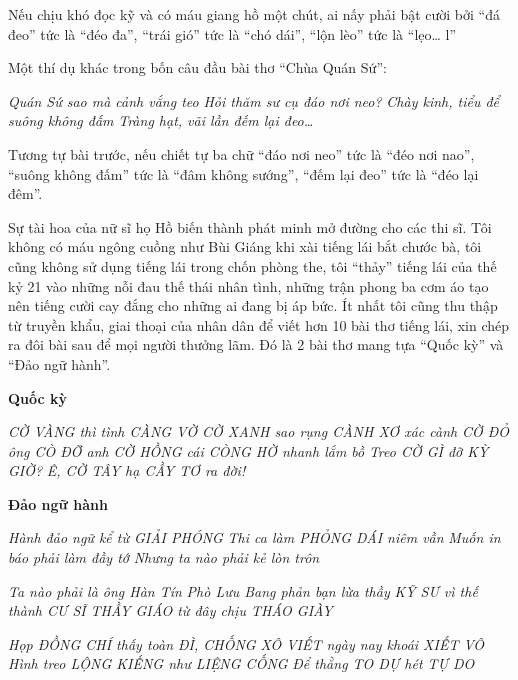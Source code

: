 \documentclass[../main.tex]{subfiles}
\begin{document}
\begin{multicols}{2}
\begin{blockquote}
\end{blockquote}
 
Nếu chịu khó đọc kỹ và có máu giang hồ một chút, ai nấy phải bật cười bởi “đá đeo” tức là “đéo đa”, “trái gió” tức là “chó dái”, “lộn lèo” tức là “lẹo… l” 
 
Một thí dụ khác trong bốn câu đầu bài thơ “Chùa Quán Sứ”: 
\begin{blockquote}
        
\textit{Quán Sứ sao mà cảnh vắng teo}        
\textit{Hỏi thăm sư cụ đáo nơi neo?}        
\textit{Chày kinh, tiểu để suông không đấm} 
\textit{Tràng hạt, vãi lần đếm lại đeo…} 

\end{blockquote}
 
Tương tự bài trước, nếu chiết tự ba chữ “đáo nơi neo” tức là “đéo nơi nao”, “suông không đấm” tức là “đâm không sướng”, “đếm lại đeo” tức là “đéo lại đêm”. 
 
Sự tài hoa của nữ sĩ họ Hồ biến thành phát minh mở đường cho các thi sĩ. Tôi không có máu ngông cuồng như Bùi Giáng khi xài tiếng lái bắt chước bà, tôi cũng không sử dụng tiếng lái trong chốn phòng the, tôi “thảy” tiếng lái của thế kỷ 21 vào những nỗi đau thế thái nhân tình, những trận phong ba cơm áo tạo nên tiếng cười cay đắng cho những ai đang bị áp bức. Ít nhất tôi cũng thu thập từ truyền khẩu, giai thoại của nhân dân để viết hơn 10 bài thơ tiếng lái, xin chép ra đôi bài sau để mọi người thưởng lãm. Ðó là 2 bài thơ mang tựa “Quốc kỳ” và “Ðảo ngữ hành”. 
\begin{blockquote}
 
\textbf{Quốc kỳ} 
        
\textit{CỜ VÀNG thì tình CÀNG VỜ}        
\textit{CỜ XANH  sao rụng CÀNH XƠ xác cành}        
\textit{CỜ ĐỎ ông CÒ ĐỠ anh}        
\textit{CỜ HỒNG cái CÒNG HỜ nhanh lắm bồ}        
\textit{Treo CỜ GÌ đỡ KỲ GIỜ?} 
\textit{Ê, CỜ TÂY hạ CẦY TƠ  ra đời!} 
 
 
\textbf{Ðảo ngữ hành} 
        
\textit{Hành đảo ngữ kể từ GIẢI PHÓNG }        
\textit{Thi ca làm PHỎNG DÁI niêm vần}        
\textit{Muốn in báo phải làm đầy tớ} 
\textit{Nhưng ta nào phải kẻ lòn trôn} 
        
\textit{Ta nào phải là ông Hàn Tín}        
\textit{Phò Lưu Bang phản bạn lừa thầy}        
\textit{KỸ SƯ vì thế thành CƯ SĨ} 
\textit{THẦY GIÁO từ đây chịu THÁO GIÀY} 
        
\textit{Họp ĐỒNG CHÍ thấy toàn ĐÌ, CHỐNG}        
\textit{XÔ VIẾT ngày nay khoái XIẾT VÔ}        
\textit{Hình treo LỘNG KIẾNG như LIỆNG CỐNG} 
\textit{Ðể thằng TO DỰ hét TỰ DO } 
        

\end{blockquote}
\end{multicols}
\end{document}
